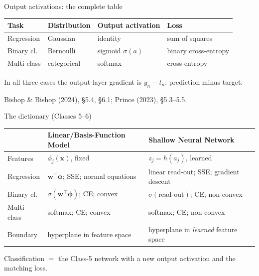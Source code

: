 \documentclass[aspectratio=169, 11pt]{beamer}
\newcommand{\figsource}[1]{{\scriptsize\color{mcMuted} #1}}
\newcommand{\nosrc}{}       %
\begin{document}
\begin{frame}{Output activations: the complete table}
  \nosrc
  \centering
  \renewcommand{\arraystretch}{1.2}
  {\small
  \begin{tabular}{p{} p{}
                  p{} p{}}
    \textbf{Task} & \textbf{Distribution} &
    \textbf{Output activation} & \textbf{Loss}\\
    \hline
    Regression & Gaussian &
      identity &
      sum of squares\\
    Binary cl. & Bernoulli &
      sigmoid $\sigma(a)$ &
      binary cross-entropy\\
    Multi-class & categorical &
      softmax &
      cross-entropy\\
    \hline
  \end{tabular}}
  \vspace{0.5em}

  {\small In all three cases the output-layer gradient is
  \alert{$y_n - t_n$}: prediction minus target.}

  \vspace{0.2em}
  \figsource{Bishop \& Bishop (2024), \S5.4, \S6.1;
  Prince (2023), \S5.3--5.5.}
\end{frame}

\begin{frame}{The dictionary (Classes 5--6)}
  \nosrc
  \centering
  \renewcommand{\arraystretch}{1.12}
  {\footnotesize
  \begin{tabular}{p{} p{}
                  p{}}
    & \textbf{\color{mlc}Linear/Basis-Function Model}
    & \textbf{\color{nnc}Shallow Neural Network}\\
    \hline
    Features
      & $\phi_j(\mathbf{x})$, fixed
      & $z_j = h(a_j)$, learned\\
    Regression
      & $\mathbf{w}^{\!\top}\boldsymbol{\phi}$; SSE;
        normal equations
      & linear read-out; SSE; gradient descent\\
    Binary cl.
      & $\sigma(\mathbf{w}^{\!\top}
        \boldsymbol{\phi})$; CE; convex
      & $\sigma(\text{read-out})$; CE; non-convex\\
    Multi-class
      & softmax; CE; convex
      & softmax; CE; non-convex\\
    Boundary
      & hyperplane in feature space
      & hyperplane in \emph{learned} feature space\\
    \hline
  \end{tabular}}
  \vspace{0.5em}
  \begin{redhighlight}
    Classification $=$ the Class-5 network with a new
    output activation and the matching loss.
  \end{redhighlight}
\end{frame}
\end{document}
